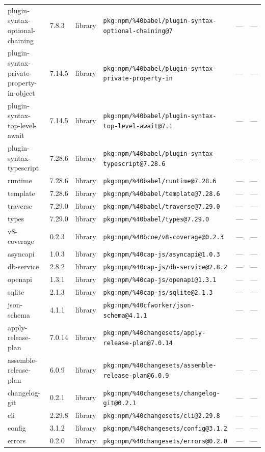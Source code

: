 \documentclass[11pt]{article}
\begin{document}
\begin{longtable}{|l|l|l|p{2.2cm}|l|p{4cm}|}
plugin-syntax-optional-chaining & 7.8.3 & library & \texttt{pkg:npm/\%40babel/plugin-syntax-optional-chaining@7} & — & — \\
plugin-syntax-private-property-in-object & 7.14.5 & library & \texttt{pkg:npm/\%40babel/plugin-syntax-private-property-in} & — & — \\
plugin-syntax-top-level-await & 7.14.5 & library & \texttt{pkg:npm/\%40babel/plugin-syntax-top-level-await@7.1} & — & — \\
plugin-syntax-typescript & 7.28.6 & library & \texttt{pkg:npm/\%40babel/plugin-syntax-typescript@7.28.6} & — & — \\
runtime & 7.28.6 & library & \texttt{pkg:npm/\%40babel/runtime@7.28.6} & — & — \\
template & 7.28.6 & library & \texttt{pkg:npm/\%40babel/template@7.28.6} & — & — \\
traverse & 7.29.0 & library & \texttt{pkg:npm/\%40babel/traverse@7.29.0} & — & — \\
types & 7.29.0 & library & \texttt{pkg:npm/\%40babel/types@7.29.0} & — & — \\
v8-coverage & 0.2.3 & library & \texttt{pkg:npm/\%40bcoe/v8-coverage@0.2.3} & — & — \\
asyncapi & 1.0.3 & library & \texttt{pkg:npm/\%40cap-js/asyncapi@1.0.3} & — & — \\
db-service & 2.8.2 & library & \texttt{pkg:npm/\%40cap-js/db-service@2.8.2} & — & — \\
openapi & 1.3.1 & library & \texttt{pkg:npm/\%40cap-js/openapi@1.3.1} & — & — \\
sqlite & 2.1.3 & library & \texttt{pkg:npm/\%40cap-js/sqlite@2.1.3} & — & — \\
json-schema & 4.1.1 & library & \texttt{pkg:npm/\%40cfworker/json-schema@4.1.1} & — & — \\
apply-release-plan & 7.0.14 & library & \texttt{pkg:npm/\%40changesets/apply-release-plan@7.0.14} & — & — \\
assemble-release-plan & 6.0.9 & library & \texttt{pkg:npm/\%40changesets/assemble-release-plan@6.0.9} & — & — \\
changelog-git & 0.2.1 & library & \texttt{pkg:npm/\%40changesets/changelog-git@0.2.1} & — & — \\
cli & 2.29.8 & library & \texttt{pkg:npm/\%40changesets/cli@2.29.8} & — & — \\
config & 3.1.2 & library & \texttt{pkg:npm/\%40changesets/config@3.1.2} & — & — \\
errors & 0.2.0 & library & \texttt{pkg:npm/\%40changesets/errors@0.2.0} & — & — \\

\end{longtable}
\end{document}
